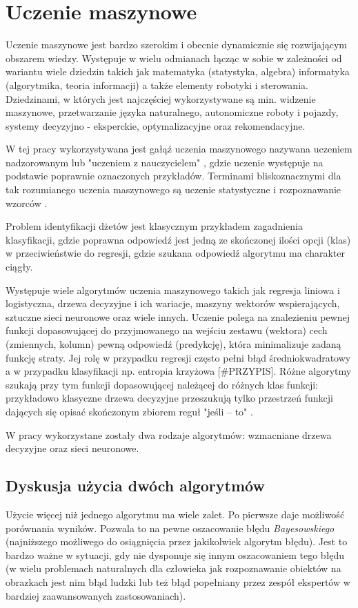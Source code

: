 \clearpage
\section{Uczenie maszynowe}
\label{sec:ml}

Uczenie maszynowe jest bardzo szerokim i obecnie dynamicznie się rozwijającym obszarem wiedzy. Występuje w wielu odmianach łącząc w sobie w zależności od wariantu wiele dziedzin takich jak matematyka (statystyka, algebra) informatyka (algorytmika, teoria informacji) a także elementy robotyki i sterowania. 
Dziedzinami, w których jest najczęściej wykorzystywane są min. widzenie maszynowe, przetwarzanie języka naturalnego, autonomiczne roboty i pojazdy, systemy decyzyjno - eksperckie, optymalizacyjne oraz rekomendacyjne.

W tej pracy wykorzystywana jest gałąź uczenia maszynowego nazywana uczeniem nadzorowanym lub "uczeniem z nauczycielem" , gdzie uczenie występuje na podstawie poprawnie oznaczonych przykładów. Terminami bliskoznacznymi dla tak rozumianego uczenia maszynowego są uczenie statystyczne  i rozpoznawanie wzorców .

Problem identyfikacji dżetów jest klasycznym przykładem zagadnienia klasyfikacji, gdzie poprawna odpowiedź jest jedną ze skończonej ilości opcji (klas) w przeciwieństwie do regresji, gdzie szukana odpowiedź algorytmu ma charakter ciągły. 

Występuje wiele algorytmów uczenia maszynowego takich jak regresja liniowa i logistyczna, drzewa decyzyjne i ich wariacje, maszyny wektorów wspierających, sztuczne sieci neuronowe oraz wiele innych. Uczenie polega na znalezieniu pewnej funkcji dopasowującej do przyjmowanego na wejściu zestawu (wektora) cech (zmiennych, kolumn) pewną odpowiedź (predykcję), która minimalizuje zadaną funkcję straty. Jej rolę w przypadku regresji często pełni błąd średniokwadratowy a w przypadku klasyfikacji np. entropia krzyżowa  [\#PRZYPIS]. 
Różne algorytmy szukają przy tym funkcji dopasowującej należącej do różnych klas funkcji: przykładowo klasyczne drzewa decyzyjne przeszukują tylko przestrzeń funkcji dających się opisać skończonym zbiorem reguł "jeśli -- to" .

W pracy wykorzystane zostały dwa rodzaje algorytmów: wzmacniane drzewa decyzyjne oraz sieci neuronowe.
\FloatBarrier



\FloatBarrier
\subsection{Dyskusja użycia dwóch algorytmów}
Użycie więcej niż jednego algorytmu ma wiele zalet. 
Po pierwsze daje możliwość porównania wyników. Pozwala to na pewne oszacowanie błędu \textit{Bayesowskiego} (najniższego możliwego do osiągnięcia przez jakikolwiek algorytm błędu). Jest to bardzo ważne w sytuacji, gdy nie dysponuje się innym oszacowaniem tego błędu (w wielu problemach naturalnych dla człowieka jak rozpoznawanie obiektów na obrazkach jest nim błąd ludzki lub też błąd popełniany przez zespół ekspertów w bardziej zaawansowanych zastosowaniach).

